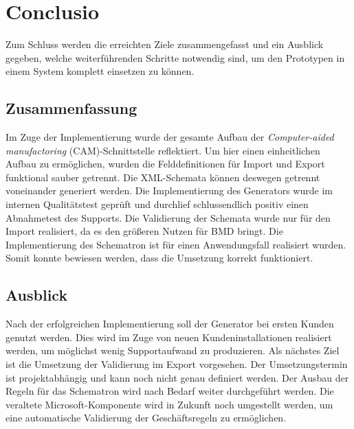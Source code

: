 \chapter{Conclusio}
\label{cha:Schluss}
Zum Schluss werden die erreichten Ziele zusammengefasst und ein Ausblick gegeben, welche weiterführenden Schritte notwendig sind, um den Prototypen in einem System komplett einsetzen zu können.

\section{Zusammenfassung}
Im Zuge der Implementierung wurde der gesamte Aufbau der \emph{Computer-aided manufactoring} (CAM)-\-Schnitt\-stelle reflektiert. 
Um hier einen einheitlichen Aufbau zu ermöglichen, wurden die Felddefinitionen für Import und Export funktional sauber getrennt. 
Die XML-Schemata können deswegen getrennt voneinander generiert werden.
Die Implementierung des Generators wurde im internen Qualitätstest geprüft und durchlief schlussendlich positiv einen Abnahmetest des Supports.
Die Validierung der Schemata wurde nur für den Import realisiert, da es den größeren Nutzen für BMD bringt. 
Die Implementierung des Schematron ist für einen Anwendungsfall realisiert wurden. Somit konnte bewiesen werden, dass die Umsetzung korrekt funktioniert.



\section{Ausblick}
Nach der erfolgreichen Implementierung soll der Generator bei ersten Kunden genutzt werden. Dies wird im Zuge von neuen Kundeninstallationen realisiert werden, um möglichst wenig Supportaufwand zu produzieren.
Als nächstes Ziel ist die Umsetzung der Validierung im Export vorgesehen. Der Umsetzungstermin ist projektabhängig und kann noch nicht genau definiert werden.
Der Ausbau der Regeln für das Schematron wird nach Bedarf weiter durchgeführt werden. Die veraltete Microsoft-Komponente wird in Zukunft noch umgestellt werden, um eine automatische Validierung der Geschäftsregeln zu ermöglichen.


